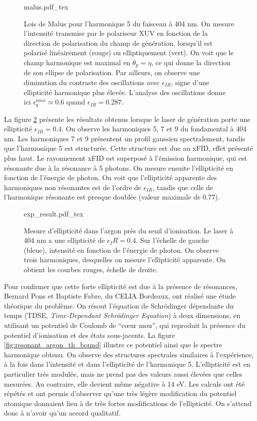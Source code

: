 \begin{figure}[!ht]
\centering
\def\svgwidth{0.7\columnwidth}
{malus.pdf_tex}
\caption{Lois de Malus pour l'harmonique 5 du faisceau à 404 nm. On mesure l'intensité transmise par le polariseur XUV en fonction de la direction de polarisation du champ de génération, lorsqu'il est polarisé linéairement (rouge) ou elliptiquement (vert). On voit que le champ harmonique est maximal en $\theta_p = \eta$, ce qui donne la direction de son ellipse de polarisation. Par ailleurs, on observe une diminution du contraste des oscillations avec $\epsilon_{IR}$, signe d'une ellipticité harmonique plus élevée. L'analyse des oscillations donne ici $\epsilon_q^{max} \simeq 0.6$ quand $\epsilon_{IR}=0.287$.}
\label{fig:malus}
\end{figure}

La figure \ref{fig:resonant_argon_exp} présente les résultats obtenus lorsque le laser de génération porte une ellipticité $\epsilon_{IR} = 0.4$. On observe les harmoniques 5, 7 et 9 du fondamental à 404 nm. Les harmoniques 7 et 9 présentent un profil gaussien spectralement, tandis que l'harmonique 5 est structurée. Cette structure est due au xFID, effet présenté plus haut. Le rayonnement xFID est superposé à l'émission harmonique, qui est résonante due à la résonance à 5 photons.  On mesure ensuite l'ellipticité en fonction de l'énergie de photon. On voit que l'ellipticité apparente des harmoniques non résonantes est de l'ordre de $\epsilon_{IR}$, tandis que celle de l'harmonique résonante est presque doublée (valeur maximale de 0.77).  

\begin{figure}[!ht]
\centering
\def\svgwidth{1\columnwidth}
{exp_result.pdf_tex}
\caption{Mesure d'ellipticité dans l'argon près du seuil d'ionisation. Le laser à 404 nm a une ellipticité de $\epsilon_IR=0.4$. Sur l'échelle de gauche (bleue), intensité en fonction de l'énergie de photon. On observe trois harmoniques, desquelles on mesure l'ellipticité apparente. On obtient les courbes rouges, échelle de droite.}
\label{fig:resonant_argon_exp}
\end{figure}

Pour confirmer que cette forte ellipticité est due à la présence de résonances, Bernard Pons et Baptiste Fabre, du CELIA Bordeaux, ont réalisé une étude théorique du problème. On résout l'équation de Schrödinger dépendante du temps (TDSE, \textit{Time-Dependant Schrödinger Equation}) à deux dimensions, en utilisant un potentiel de Coulomb de "`cœur mou"', qui reproduit la présence du potentiel d'ionisation et des états sous-jacents. La figure \ref{fig:resonant_argon_th_bound} illustre ce potentiel ainsi que le spectre harmonique obtenu. On observe des structures spectrales similaires à l'expérience, à la fois dans l'intensité et dans l'ellipticité de l'harmonique 5. L'ellipticité est en particulier très modulée, mais ne prend pas des valeurs aussi élevées que celles mesurées. Au contraire, elle devient même négative à 14 eV. Les calculs ont été répétés et ont permis d'observer qu'une très légère modification du potentiel atomique donnaient lieu à de très fortes modifications de l'ellipticité. On s'attend donc à n'avoir qu'un accord qualitatif.

